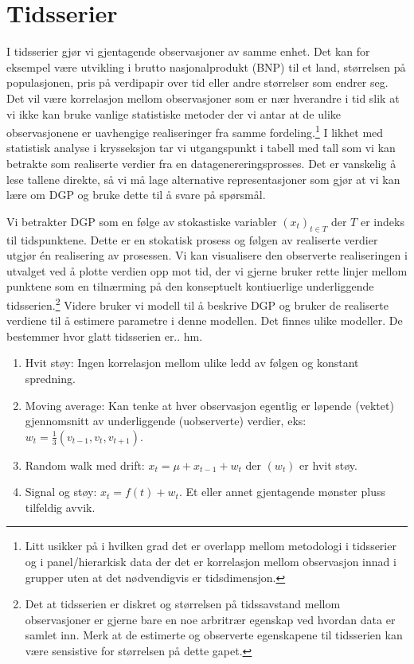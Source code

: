 \chapter{Tidsserier}
I tidsserier gjør vi gjentagende observasjoner av samme enhet. Det kan for eksempel være utvikling i brutto nasjonalprodukt (BNP) til et land, størrelsen på populasjonen, pris på verdipapir over tid eller andre størrelser som endrer seg. Det vil være korrelasjon mellom observasjoner som er nær hverandre i tid slik at vi ikke kan bruke vanlige statistiske metoder der vi antar at de ulike observasjonene er uavhengige realiseringer fra samme fordeling.\footnote{Litt usikker på i hvilken grad det er overlapp mellom metodologi i tidsserier og i panel/hierarkisk data der det er korrelasjon mellom observasjon innad i grupper uten at det nødvendigvis er tidsdimensjon.} I likhet med statistisk analyse i krysseksjon tar vi utgangspunkt i tabell med tall som vi kan betrakte som realiserte verdier fra en datagenereringsprosses. Det er vanskelig å lese tallene direkte, så vi må lage alternative representasjoner som gjør at vi kan lære om DGP og bruke dette til å svare på spørsmål.

Vi betrakter DGP som en følge av stokastiske variabler $(x_t)_{t \in T}$ der $T$ er indeks til tidspunktene. Dette er en stokatisk prosess og følgen av realiserte verdier utgjør én realisering av prosessen. Vi kan visualisere den observerte realiseringen i utvalget ved å plotte verdien opp mot tid, der vi gjerne bruker rette linjer mellom punktene som en tilnærming på den konseptuelt kontiuerlige underliggende tidsserien.\footnote{Det at tidsserien er diskret og størrelsen på tidssavstand mellom observasjoner er gjerne bare en noe arbritrær egenskap ved hvordan data er samlet inn. Merk at de estimerte og observerte egenskapene til tidsserien kan være sensistive for størrelsen på dette gapet.} Videre bruker vi modell til å beskrive DGP og bruker de realiserte verdiene til å estimere parametre i denne modellen. Det finnes ulike modeller. De bestemmer hvor glatt tidsserien er.. hm.
\begin{enumerate}
\item Hvit støy: Ingen korrelasjon mellom ulike ledd av følgen og konstant spredning.
\item Moving average: Kan tenke at hver observasjon egentlig er løpende (vektet) gjennomsnitt av underliggende (uobserverte) verdier, eks: $w_t = \frac{1}{3}(v_{t-1}, v_t, v_{t+1})$.
\item Random walk med drift: $x_t = \mu + x_{t-1}+w_t$ der $(w_t)$ er hvit støy.
\item Signal og støy: $x_t = f(t)+w_t$. Et eller annet gjentagende mønster pluss tilfeldig avvik.
\end{enumerate}
